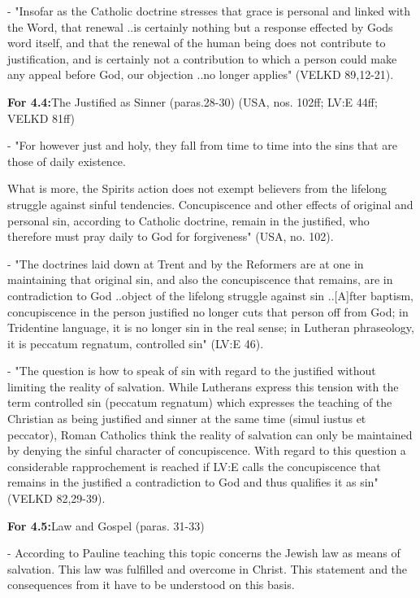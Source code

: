 - "Insofar as the Catholic doctrine stresses that grace is personal and
linked with the Word, that renewal ..is certainly nothing but a response
effected by God\textquotesingle s word itself, and that the renewal of
the human being does not contribute to justification, and is certainly
not a contribution to which a person could make any appeal before God,
our objection ..no longer applies" (VELKD 89,12-21).

\textbf{For 4.4:}The Justified as Sinner (paras.28-30) (USA, nos. 102ff;
LV:E 44ff; VELKD 81ff)

- "For however just and holy, they fall from time to time into the sins
that are those of daily existence.

What is more, the Spirit\textquotesingle s action does not exempt
believers from the lifelong struggle against sinful tendencies.
Concupiscence and other effects of original and personal sin, according
to Catholic doctrine, remain in the justified, who therefore must pray
daily to God for forgiveness" (USA, no. 102).

- "The doctrines laid down at Trent and by the Reformers are at one in
maintaining that original sin, and also the concupiscence that remains,
are in contradiction to God ..object of the lifelong struggle against
sin ..{[}A{]}fter baptism, concupiscence in the person justified no
longer cuts that person off from God; in Tridentine language, it is
\textquotesingle no longer sin in the real sense\textquotesingle; in
Lutheran phraseology, it is peccatum regnatum,
\textquotesingle controlled sin\textquotesingle" (LV:E 46).

- "The question is how to speak of sin with regard to the justified
without limiting the reality of salvation. While Lutherans express this
tension with the term \textquotesingle controlled sin\textquotesingle{}
(peccatum regnatum) which expresses the teaching of the Christian as
\textquotesingle being justified and sinner at the same
time\textquotesingle{} (simul iustus et peccator), Roman Catholics think
the reality of salvation can only be maintained by denying the sinful
character of concupiscence. With regard to this question a considerable
rapprochement is reached if LV:E calls the concupiscence that remains in
the justified a \textquotesingle contradiction to God\textquotesingle{}
and thus qualifies it as sin" (VELKD 82,29-39).

\textbf{For 4.5:}Law and Gospel (paras. 31-33)

- According to Pauline teaching this topic concerns the Jewish law as
means of salvation. This law was fulfilled and overcome in Christ. This
statement and the consequences from it have to be understood on this
basis.

